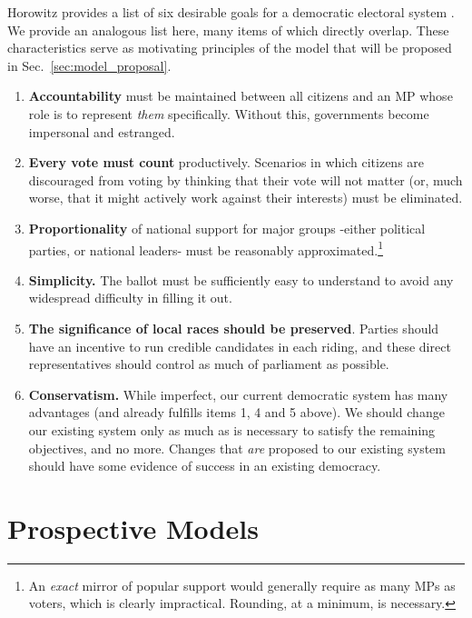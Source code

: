 Horowitz provides a list of six desirable goals for a democratic electoral system \citep{Horowitz}. We provide an analogous list here, many items of which directly overlap. These characteristics serve as motivating principles of the model that will be proposed in Sec.~\ref{sec:model_proposal}.
\begin{enumerate}
\item \textbf{Accountability} must be maintained between all citizens and an MP whose role is to represent \emph{them} specifically. Without this, governments become impersonal and estranged.
\item \textbf{Every vote must count} productively. Scenarios in which citizens are discouraged from voting by thinking that their vote will not matter (or, much worse, that it might actively work against their interests) must be eliminated.
\item \textbf{Proportionality} of national support for major groups \--either political parties, or national leaders\-- must be reasonably approximated.\footnote{
An \emph{exact} mirror of popular support would generally require as many MPs as voters, which is clearly impractical. Rounding, at a minimum, is necessary.
}
\item   \textbf{Simplicity.} The ballot must be sufficiently easy to understand to avoid any widespread difficulty in filling it out.

\item  \textbf{The significance of local races should be preserved}. Parties should have an incentive to run credible candidates in each riding, and these direct representatives should control as much of parliament as possible.
\item \textbf{Conservatism.} While imperfect, our current democratic system has many advantages (and already fulfills items 1, 4 and 5 above). We should change our existing system only as much as is necessary to satisfy the remaining objectives, and no more. Changes that \emph{are} proposed to our existing system should have some evidence of success in an existing democracy.
\end{enumerate}


\section{Prospective Models}
\label{sec:alt_models}

